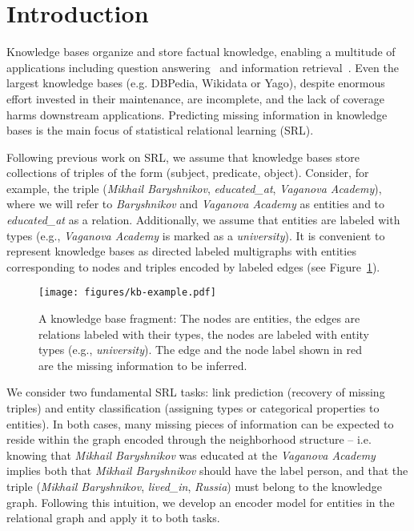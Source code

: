\section{Introduction}
Knowledge bases organize and store factual knowledge, enabling
a multitude of applications including question answering~\cite{yao2014information,bao2014knowledge,seyler2015generating,hixon2015learning,bordes2015large,dong2015question} and information retrieval~\cite{kotov2012tapping,dalton2014entity,xiong2015query,xiong2015esdrank}.
Even the largest knowledge
bases (e.g. DBPedia, Wikidata or Yago), despite enormous effort invested in their maintenance, are incomplete, and the lack of coverage
harms downstream applications. Predicting missing
information in knowledge bases is the main focus of statistical relational learning (SRL).

Following previous work on SRL, we assume that knowledge bases store collections of triples of the form (subject, predicate, object). Consider, for example, the triple (\textit{Mikhail Baryshnikov}, \textit{educated\_at}, \textit{Vaganova Academy}), where we will refer to {\it Baryshnikov} and {\it Vaganova Academy} as entities and to {\it educated\_at} as a relation. Additionally, we assume that entities are labeled with types (e.g.,  {\it Vaganova Academy} is marked as a {\it university}).
It is convenient to represent knowledge bases as directed labeled multigraphs with entities corresponding to nodes and triples encoded by labeled edges (see Figure~\ref{fig:kb}).

\begin{figure}[t!]
    \centering
    \texttt{[image: figures/kb-example.pdf]}
    \caption{A knowledge base fragment: The nodes are entities, the edges are relations labeled with their types, the nodes are labeled with entity types (e.g., {\it university}). The edge and the node label shown in red are the missing information to be inferred.}
    \label{fig:kb}
\end{figure}

We consider two fundamental SRL tasks: link prediction (recovery of missing triples) and entity classification (assigning types or categorical properties to entities). In both cases, many missing pieces of information can be expected to reside within the graph encoded through the neighborhood structure -- i.e.  knowing that \textit{Mikhail Baryshnikov} was educated at the \textit{Vaganova Academy} implies both that \textit{Mikhail Baryshnikov} should have the label person, and that the triple (\textit{Mikhail Baryshnikov}, \textit{lived\_in}, \textit{Russia}) must belong to the knowledge graph. Following this intuition, we develop an encoder model for entities in the relational graph and apply it to both tasks.

